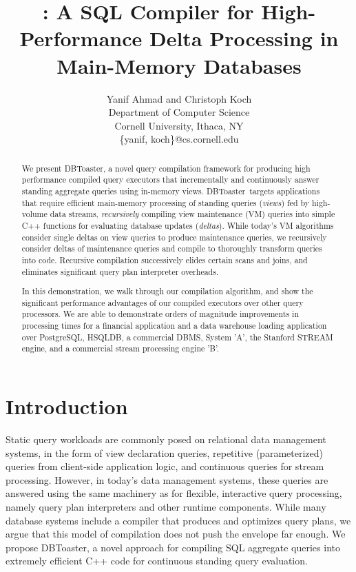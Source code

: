 \documentclass{vldb}
\title{\compiler: A SQL Compiler for High-Performance Delta Processing in
Main-Memory Databases}
\author{Yanif Ahmad and Christoph Koch \\
Department of Computer Science \\ Cornell University, Ithaca, NY \\
\{yanif, koch\}@cs.cornell.edu}
\date{}
\newcommand{\comment}[1]{}
\newcommand{\compiler}{DBToaster}
\begin{document}
\maketitle

\begin{abstract}
We present \compiler, a novel query compilation framework for producing high
performance compiled query executors that incrementally and continuously answer
standing aggregate queries using in-memory views. \compiler\ targets applications
that require efficient main-memory processing of standing queries
(\textit{views}) fed by high-volume data streams, \textit{recursively} compiling
view maintenance (VM) queries into simple C++ functions for evaluating database
updates (\textit{deltas}).
While today's VM algorithms consider single deltas on view queries to produce
maintenance queries, we recursively consider deltas of maintenance queries and
compile to thoroughly transform queries into code. Recursive compilation
successively elides certain scans and joins, and eliminates significant query
plan interpreter overheads.
\comment{
Our compilation process models and implements group-by aggregates as
an associative map data structure, and obtains procedures to update these maps by
applying a set of map expression rewrites, which can then easily be turned into
C++ code.
}

In this demonstration, we walk through our compilation algorithm, and show the
significant performance advantages of our compiled executors over other query
processors. We are able to demonstrate orders of magnitude improvements in
processing times for a financial application and a data warehouse loading
application over PostgreSQL, HSQLDB, a commercial DBMS, System 'A', the Stanford
STREAM engine, and a commercial stream processing engine 'B'.
\end{abstract}


\section{Introduction}
Static query workloads are commonly posed on relational data management systems,
in the form of view declaration queries, repetitive (parameterized) queries from
client-side application logic, and continuous queries for stream processing.
However, in today's data management systems, these queries are answered using the
same machinery as for flexible, interactive query processing, namely query plan
interpreters and other runtime components. While many database systems include a
compiler that produces and optimizes query plans, we argue that this model of
compilation does not push the envelope far enough. We propose \compiler, a novel
approach for compiling SQL aggregate queries into extremely efficient C++ code
for continuous standing query evaluation.
\end{document}
